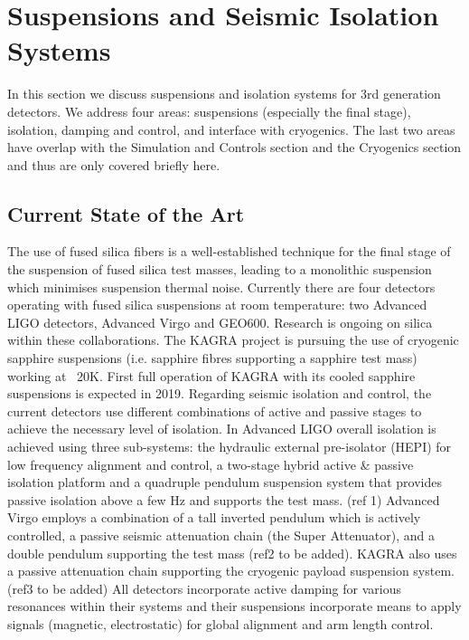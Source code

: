 \chapter{Suspensions and Seismic Isolation Systems}
\label{sec:Suspensions_Isolation}
In this section we discuss suspensions and isolation systems for 3rd generation detectors. We address four areas: suspensions (especially the final stage), isolation, damping and control, and interface with cryogenics. The last two areas have overlap with the Simulation and Controls section and the Cryogenics section and thus are only covered briefly here.
\section{Current State of the Art}
The use of fused silica fibers is a well-established technique for the final stage of the suspension of fused silica test masses, leading to a monolithic suspension which minimises suspension thermal noise. Currently there are four detectors operating with fused silica suspensions at room temperature: two Advanced LIGO detectors, Advanced Virgo and GEO600. Research is ongoing on silica within these collaborations.
The KAGRA project is pursuing the use of cryogenic sapphire suspensions (i.e. sapphire fibres supporting a sapphire test mass) working at ~20K. First full operation of KAGRA with its cooled sapphire suspensions is expected in 2019.
Regarding seismic isolation and control, the current detectors use different combinations of active and passive stages to achieve the necessary level of isolation. In Advanced LIGO overall isolation is achieved using three sub-systems: the hydraulic external pre-isolator (HEPI) for low frequency alignment and control, a two-stage hybrid active \& passive isolation platform and a quadruple pendulum suspension system that provides passive isolation above a few Hz and supports the test mass. (ref 1)  Advanced Virgo employs a combination of a tall inverted pendulum which is actively controlled, a passive seismic attenuation chain (the Super Attenuator), and a double pendulum supporting the test mass (ref2 to be added). KAGRA also uses a passive attenuation chain supporting the cryogenic payload suspension system. (ref3 to be added) All detectors incorporate active damping for various resonances within their systems and their suspensions incorporate means to apply signals (magnetic, electrostatic) for global alignment and arm length control.
